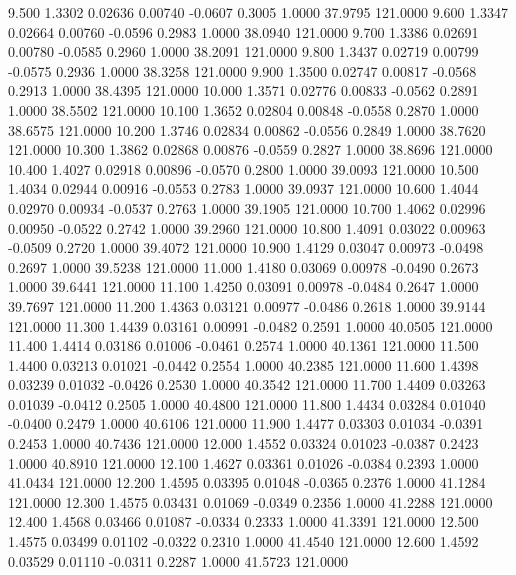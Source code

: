    9.500   1.3302   0.02636   0.00740  -0.0607   0.3005   1.0000  37.9795 121.0000
   9.600   1.3347   0.02664   0.00760  -0.0596   0.2983   1.0000  38.0940 121.0000
   9.700   1.3386   0.02691   0.00780  -0.0585   0.2960   1.0000  38.2091 121.0000
   9.800   1.3437   0.02719   0.00799  -0.0575   0.2936   1.0000  38.3258 121.0000
   9.900   1.3500   0.02747   0.00817  -0.0568   0.2913   1.0000  38.4395 121.0000
  10.000   1.3571   0.02776   0.00833  -0.0562   0.2891   1.0000  38.5502 121.0000
  10.100   1.3652   0.02804   0.00848  -0.0558   0.2870   1.0000  38.6575 121.0000
  10.200   1.3746   0.02834   0.00862  -0.0556   0.2849   1.0000  38.7620 121.0000
  10.300   1.3862   0.02868   0.00876  -0.0559   0.2827   1.0000  38.8696 121.0000
  10.400   1.4027   0.02918   0.00896  -0.0570   0.2800   1.0000  39.0093 121.0000
  10.500   1.4034   0.02944   0.00916  -0.0553   0.2783   1.0000  39.0937 121.0000
  10.600   1.4044   0.02970   0.00934  -0.0537   0.2763   1.0000  39.1905 121.0000
  10.700   1.4062   0.02996   0.00950  -0.0522   0.2742   1.0000  39.2960 121.0000
  10.800   1.4091   0.03022   0.00963  -0.0509   0.2720   1.0000  39.4072 121.0000
  10.900   1.4129   0.03047   0.00973  -0.0498   0.2697   1.0000  39.5238 121.0000
  11.000   1.4180   0.03069   0.00978  -0.0490   0.2673   1.0000  39.6441 121.0000
  11.100   1.4250   0.03091   0.00978  -0.0484   0.2647   1.0000  39.7697 121.0000
  11.200   1.4363   0.03121   0.00977  -0.0486   0.2618   1.0000  39.9144 121.0000
  11.300   1.4439   0.03161   0.00991  -0.0482   0.2591   1.0000  40.0505 121.0000
  11.400   1.4414   0.03186   0.01006  -0.0461   0.2574   1.0000  40.1361 121.0000
  11.500   1.4400   0.03213   0.01021  -0.0442   0.2554   1.0000  40.2385 121.0000
  11.600   1.4398   0.03239   0.01032  -0.0426   0.2530   1.0000  40.3542 121.0000
  11.700   1.4409   0.03263   0.01039  -0.0412   0.2505   1.0000  40.4800 121.0000
  11.800   1.4434   0.03284   0.01040  -0.0400   0.2479   1.0000  40.6106 121.0000
  11.900   1.4477   0.03303   0.01034  -0.0391   0.2453   1.0000  40.7436 121.0000
  12.000   1.4552   0.03324   0.01023  -0.0387   0.2423   1.0000  40.8910 121.0000
  12.100   1.4627   0.03361   0.01026  -0.0384   0.2393   1.0000  41.0434 121.0000
  12.200   1.4595   0.03395   0.01048  -0.0365   0.2376   1.0000  41.1284 121.0000
  12.300   1.4575   0.03431   0.01069  -0.0349   0.2356   1.0000  41.2288 121.0000
  12.400   1.4568   0.03466   0.01087  -0.0334   0.2333   1.0000  41.3391 121.0000
  12.500   1.4575   0.03499   0.01102  -0.0322   0.2310   1.0000  41.4540 121.0000
  12.600   1.4592   0.03529   0.01110  -0.0311   0.2287   1.0000  41.5723 121.0000
